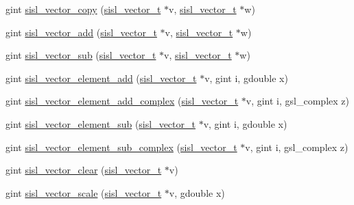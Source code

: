\begin{DoxyCompactItemize}
\item 
gint \hyperlink{group__vector_ga782dc0e416aadf242dc5c06d5c078347}{sisl\+\_\+vector\+\_\+copy} (\hyperlink{group__vector_gacbac585492f5005f05f0c0b8463039be}{sisl\+\_\+vector\+\_\+t} $\ast$v, \hyperlink{group__vector_gacbac585492f5005f05f0c0b8463039be}{sisl\+\_\+vector\+\_\+t} $\ast$w)
\item 
gint \hyperlink{group__vector_ga95c714975c15dc45106e0b46d698686f}{sisl\+\_\+vector\+\_\+add} (\hyperlink{group__vector_gacbac585492f5005f05f0c0b8463039be}{sisl\+\_\+vector\+\_\+t} $\ast$v, \hyperlink{group__vector_gacbac585492f5005f05f0c0b8463039be}{sisl\+\_\+vector\+\_\+t} $\ast$w)
\item 
gint \hyperlink{group__vector_ga9232cbb2dbb276abbbc39afe02d939f5}{sisl\+\_\+vector\+\_\+sub} (\hyperlink{group__vector_gacbac585492f5005f05f0c0b8463039be}{sisl\+\_\+vector\+\_\+t} $\ast$v, \hyperlink{group__vector_gacbac585492f5005f05f0c0b8463039be}{sisl\+\_\+vector\+\_\+t} $\ast$w)
\item 
gint \hyperlink{group__vector_ga60a3b5d4b7639a5b51fbb2a7d09f4b79}{sisl\+\_\+vector\+\_\+element\+\_\+add} (\hyperlink{group__vector_gacbac585492f5005f05f0c0b8463039be}{sisl\+\_\+vector\+\_\+t} $\ast$v, gint i, gdouble x)
\item 
gint \hyperlink{group__vector_ga1314197af0655485fe81bbd14e92482b}{sisl\+\_\+vector\+\_\+element\+\_\+add\+\_\+complex} (\hyperlink{group__vector_gacbac585492f5005f05f0c0b8463039be}{sisl\+\_\+vector\+\_\+t} $\ast$v, gint i, gsl\+\_\+complex z)
\item 
gint \hyperlink{group__vector_gab178a51567a77d4b40e23ab0511aa2ee}{sisl\+\_\+vector\+\_\+element\+\_\+sub} (\hyperlink{group__vector_gacbac585492f5005f05f0c0b8463039be}{sisl\+\_\+vector\+\_\+t} $\ast$v, gint i, gdouble x)
\item 
gint \hyperlink{group__vector_gaab6e862963fb72b8578a56973094ef76}{sisl\+\_\+vector\+\_\+element\+\_\+sub\+\_\+complex} (\hyperlink{group__vector_gacbac585492f5005f05f0c0b8463039be}{sisl\+\_\+vector\+\_\+t} $\ast$v, gint i, gsl\+\_\+complex z)
\item 
gint \hyperlink{group__vector_gac61e04a39ddbc2f6c14ebba09787e7b3}{sisl\+\_\+vector\+\_\+clear} (\hyperlink{group__vector_gacbac585492f5005f05f0c0b8463039be}{sisl\+\_\+vector\+\_\+t} $\ast$v)
\item 
gint \hyperlink{group__vector_gae10dd87e1006defb6e54392f8ef9e1e5}{sisl\+\_\+vector\+\_\+scale} (\hyperlink{group__vector_gacbac585492f5005f05f0c0b8463039be}{sisl\+\_\+vector\+\_\+t} $\ast$v, gdouble x)
\item 

\end{DoxyCompactItemize}
